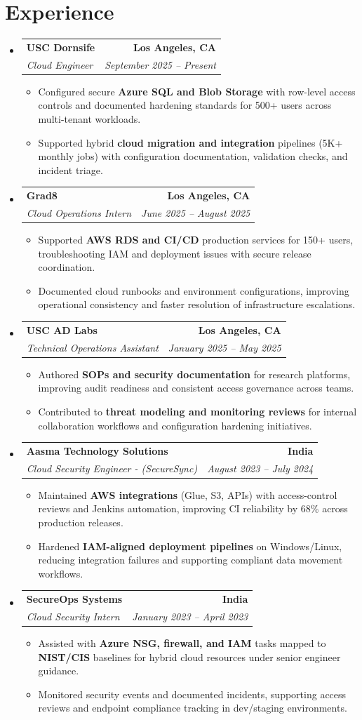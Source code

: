 \documentclass[letterpaper,10pt]{article}
\makeatletter
\newcommand{\resumeItem}[1]{\item\small{{#1 \vspace{-2pt}}}}
\newcommand{\resumeSubheading}[4]{\vspace{-1pt}\item\begin{tabular*}{1.0\textwidth}[t]{l@{\extracolsep{\fill}}r}\textbf{#1} & \textbf{\small #2} \\\textit{\small#3} & \textit{\small #4} \\\end{tabular*}\vspace{-2pt}}
\newcommand{\resumeSubHeadingListStart}{\begin{itemize}[leftmargin=0.0in, label={}]}
\newcommand{\resumeSubHeadingListEnd}{\end{itemize}}
\newcommand{\resumeItemListStart}{\begin{itemize}[leftmargin=0.15in,label=\textbullet,itemsep=2pt,topsep=0pt,parsep=0pt,partopsep=0pt]}
\newcommand{\resumeItemListEnd}{\end{itemize}\vspace{-4pt}}
\makeatother
\begin{document}
\section{Experience}
\resumeSubHeadingListStart
\resumeSubheading{USC Dornsife}{Los Angeles, CA}{Cloud Engineer}{September 2025 -- Present}
\resumeItemListStart
\resumeItem{Configured secure \textbf{Azure SQL and Blob Storage} with row-level access controls and documented hardening standards for 500+ users across multi-tenant workloads.}
\resumeItem{Supported hybrid \textbf{cloud migration and integration} pipelines (5K+ monthly jobs) with configuration documentation, validation checks, and incident triage.}
\resumeItemListEnd
\resumeSubheading{Grad8}{Los Angeles, CA}{Cloud Operations Intern}{June 2025 -- August 2025}
\resumeItemListStart
\resumeItem{Supported \textbf{AWS RDS and CI/CD} production services for 150+ users, troubleshooting IAM and deployment issues with secure release coordination.}
\resumeItem{Documented cloud runbooks and environment configurations, improving operational consistency and faster resolution of infrastructure escalations.}
\resumeItemListEnd
\resumeSubheading{USC AD Labs}{Los Angeles, CA}{Technical Operations Assistant}{January 2025 -- May 2025}
\resumeItemListStart
\resumeItem{Authored \textbf{SOPs and security documentation} for research platforms, improving audit readiness and consistent access governance across teams.}
\resumeItem{Contributed to \textbf{threat modeling and monitoring reviews} for internal collaboration workflows and configuration hardening initiatives.}
\resumeItemListEnd
\resumeSubheading{Aasma Technology Solutions}{India}{Cloud Security Engineer - (SecureSync)}{August 2023 -- July 2024}
\resumeItemListStart
\resumeItem{Maintained \textbf{AWS integrations} (Glue, S3, APIs) with access-control reviews and Jenkins automation, improving CI reliability by 68\% across production releases.}
\resumeItem{Hardened \textbf{IAM-aligned deployment pipelines} on Windows/Linux, reducing integration failures and supporting compliant data movement workflows.}
\resumeItemListEnd
\resumeSubheading{SecureOps Systems}{India}{Cloud Security Intern}{January 2023 -- April 2023}
\resumeItemListStart
\resumeItem{Assisted with \textbf{Azure NSG, firewall, and IAM} tasks mapped to \textbf{NIST/CIS} baselines for hybrid cloud resources under senior engineer guidance.}
\resumeItem{Monitored security events and documented incidents, supporting access reviews and endpoint compliance tracking in dev/staging environments.}
\resumeItemListEnd
\resumeSubHeadingListEnd
\vspace{-14pt}
\end{document}
